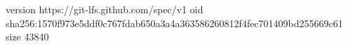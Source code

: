 version https://git-lfs.github.com/spec/v1
oid sha256:1570f973e5ddf0c767fdab650a3a4a363586260812f4fec701409bd255669c61
size 43840
